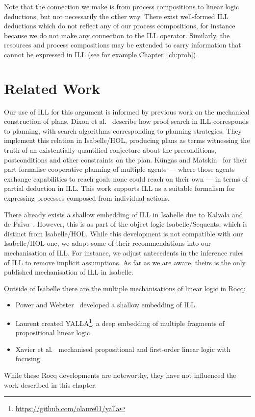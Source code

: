 \documentclass[class=smolathesis,crop=false]{standalone}
\begin{document}
Note that the connection we make is from process compositions to linear logic deductions, but not necessarily the other way.
There exist well-formed ILL deductions which do not reflect any of our process compositions, for instance because we do not make any connection to the ILL \isa{\isacharampersand} operator.
Similarly, the resources and process compositions may be extended to carry information that cannot be expressed in ILL (see for example Chapter~\ref{ch:prob}).

\section{Related Work}
\label{sec:linearity/related}

Our use of ILL for this argument is informed by previous work on the mechanical construction of plans.
Dixon et al.~\cite{dixon_et_al-2009} describe how proof search in ILL corresponds to planning, with search algorithms corresponding to planning strategies.
They implement this relation in Isabelle/HOL, producing plans as terms witnessing the truth of an existentially quantified conjecture about the preconditions, postconditions and other constraints on the plan.
K\"ungas and Matskin~\cite{kungas_matskin-2004} for their part formalise cooperative planning of multiple agents --- where those agents exchange capabilities to reach goals none could reach on their own --- in terms of partial deduction in ILL\@.
This work supports ILL as a suitable formalism for expressing processes composed from individual actions.

There already exists a shallow embedding of ILL in Isabelle due to Kalvala and de Paiva~\cite{kalvala_depaiva-1995}.
However, this is as part of the object logic Isabelle/Sequents, which is distinct from Isabelle/HOL\@.
While this development is not compatible with our Isabelle/HOL one, we adapt some of their recommendations into our mechanisation of ILL.
For instance, we adjust antecedents in the inference rules of ILL to remove implicit assumptions.
As far as we are aware, theirs is the only published mechanisation of ILL in Isabelle.

Outside of Isabelle there are the multiple mechanisations of linear logic in Rocq:
\begin{itemize}
  \item Power and Webster~\cite{power_webster-1999} developed a shallow embedding of ILL\@.
  \item Laurent created YALLA\footnote{\url{https://github.com/olaure01/yalla}}, a deep embedding of multiple fragments of propositional linear logic.
  \item Xavier et al.~\cite{xavier_et_al-2018} mechanised propositional and first-order linear logic with focusing.
\end{itemize}
While these Rocq developments are noteworthy, they have not influenced the work described in this chapter.
\end{document}
